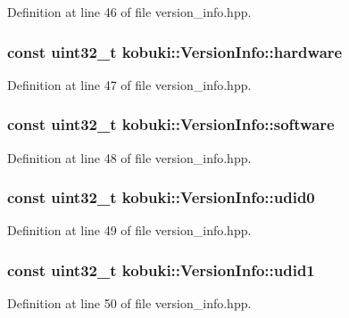 \-Definition at line 46 of file version\-\_\-info.\-hpp.

\subsubsection[{hardware}]{\setlength{\rightskip}{0pt plus 5cm}const uint32\-\_\-t {\bf kobuki\-::\-Version\-Info\-::hardware}}\label{classkobuki_1_1VersionInfo_a4d2261074a65c62c12d1fc40d1368192}


\-Definition at line 47 of file version\-\_\-info.\-hpp.

\subsubsection[{software}]{\setlength{\rightskip}{0pt plus 5cm}const uint32\-\_\-t {\bf kobuki\-::\-Version\-Info\-::software}}\label{classkobuki_1_1VersionInfo_ab2cc9f17d6e44b990259b5b281b8f4e5}


\-Definition at line 48 of file version\-\_\-info.\-hpp.

\subsubsection[{udid0}]{\setlength{\rightskip}{0pt plus 5cm}const uint32\-\_\-t {\bf kobuki\-::\-Version\-Info\-::udid0}}\label{classkobuki_1_1VersionInfo_a8a870f7880ce0b1d96e34b03f8bc9e1a}


\-Definition at line 49 of file version\-\_\-info.\-hpp.

\subsubsection[{udid1}]{\setlength{\rightskip}{0pt plus 5cm}const uint32\-\_\-t {\bf kobuki\-::\-Version\-Info\-::udid1}}\label{classkobuki_1_1VersionInfo_a98b2b65f7f2ea13ca889f73706ac14dd}


\-Definition at line 50 of file version\-\_\-info.\-hpp.

